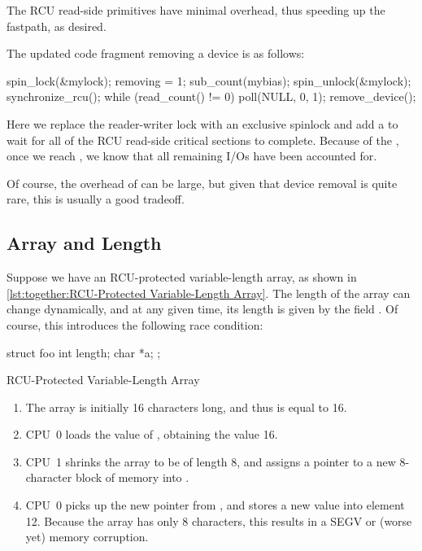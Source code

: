 The RCU read-side primitives have minimal overhead, thus speeding up
the fastpath, as desired.

The updated code fragment removing a device is as follows:

\begin{fcvlabel}
\begin{VerbatimN}[tabsize=8,commandchars=\\\[\]]
spin_lock(&mylock);
removing = 1;
sub_count(mybias);
spin_unlock(&mylock);
synchronize_rcu();
while (read_count() != 0) {	\lnlbl[nextofsync]
	poll(NULL, 0, 1);
}
remove_device();
\end{VerbatimN}
\end{fcvlabel}

\begin{fcvref}
Here we replace the reader-writer lock with an exclusive spinlock and
add a  to wait for all of the RCU read-side
critical sections to complete.
Because of the ,
once we reach ,
we know that all remaining I/Os have been accounted for.

Of course, the overhead of  can be large,
but given that device removal is quite rare, this is usually a good
tradeoff.
\end{fcvref}

\FloatBarrier
\subsection{Array and Length}
\label{sec:together:Array and Length}

Suppose we have an RCU-protected variable-length array, as shown in
\cref{lst:together:RCU-Protected Variable-Length Array}.
The length of the array  can change dynamically, and at any
given time, its length is given by the field .
Of course, this introduces the following race condition:

\begin{listing}[tbp]
\begin{VerbatimL}[tabsize=8]
struct foo {
	int length;
	char *a;
};
\end{VerbatimL}
\caption{RCU-Protected Variable-Length Array}
\label{lst:together:RCU-Protected Variable-Length Array}
\end{listing}

\begin{enumerate}
\item	The array is initially 16 characters long, and thus 
	is equal to 16.
\item	CPU~0 loads the value of , obtaining the value 16.
\item	CPU~1 shrinks the array to be of length 8, and assigns a pointer
	to a new 8-character block of memory into .
\item	CPU~0 picks up the new pointer from , and stores a
	new value into element 12.
	Because the array has only 8 characters, this results in
	a SEGV or (worse yet) memory corruption.
\end{enumerate}

